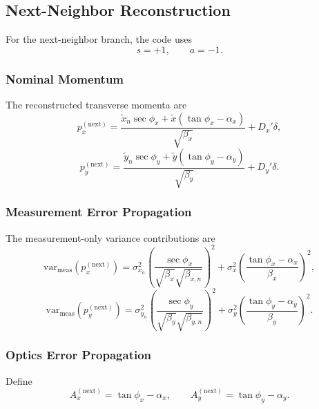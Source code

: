 \subsection{Next-Neighbor Reconstruction}

For the next-neighbor branch, the code uses
\begin{equation}
s = +1,
\qquad
a = -1.
\end{equation}

\subsubsection{Nominal Momentum}

The reconstructed transverse momenta are
\begin{equation}
p_x^{(\mathrm{next})}
=
\frac{\tilde x_n \sec\phi_x + \tilde x\left(\tan\phi_x - \alpha_x\right)}
{\sqrt{\beta_x}}
+ D_x' \delta,
\end{equation}
\begin{equation}
p_y^{(\mathrm{next})}
=
\frac{\tilde y_n \sec\phi_y + \tilde y\left(\tan\phi_y - \alpha_y\right)}
{\sqrt{\beta_y}}
+ D_y' \delta.
\end{equation}

\subsubsection{Measurement Error Propagation}

The measurement-only variance contributions are
\begin{equation}
\mathrm{var}_{\mathrm{meas}}\!\left(p_x^{(\mathrm{next})}\right)
=
\sigma^2_{x_n}
\left(
\frac{\sec\phi_x}{\sqrt{\beta_x}\sqrt{\beta_{x,n}}}
\right)^2
+
\sigma^2_x
\left(
\frac{\tan\phi_x - \alpha_x}{\beta_x}
\right)^2,
\end{equation}
\begin{equation}
\mathrm{var}_{\mathrm{meas}}\!\left(p_y^{(\mathrm{next})}\right)
=
\sigma^2_{y_n}
\left(
\frac{\sec\phi_y}{\sqrt{\beta_y}\sqrt{\beta_{y,n}}}
\right)^2
+
\sigma^2_y
\left(
\frac{\tan\phi_y - \alpha_y}{\beta_y}
\right)^2.
\end{equation}

\subsubsection{Optics Error Propagation}

Define
\begin{equation}
A_x^{(\mathrm{next})} = \tan\phi_x - \alpha_x,
\qquad
A_y^{(\mathrm{next})} = \tan\phi_y - \alpha_y.
\end{equation}

